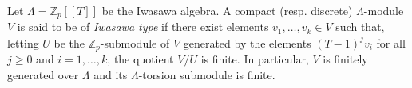 Let $\Lambda = \mathbb{Z}_p[[T]]$ be the Iwasawa algebra. A compact (resp. discrete) $\Lambda$-module $V$ is said to be of \textit{Iwasawa type} if there exist elements $v_1, \dots, v_k \in V$ such that, letting $U$ be the $\mathbb{Z}_p$-submodule of $V$ generated by the elements $(T-1)^j v_i$ for all $j \geq 0$ and $i = 1, \dots, k$, the quotient $V/U$ is finite. In particular, $V$ is finitely generated over $\Lambda$ and its $\Lambda$-torsion submodule is finite.
